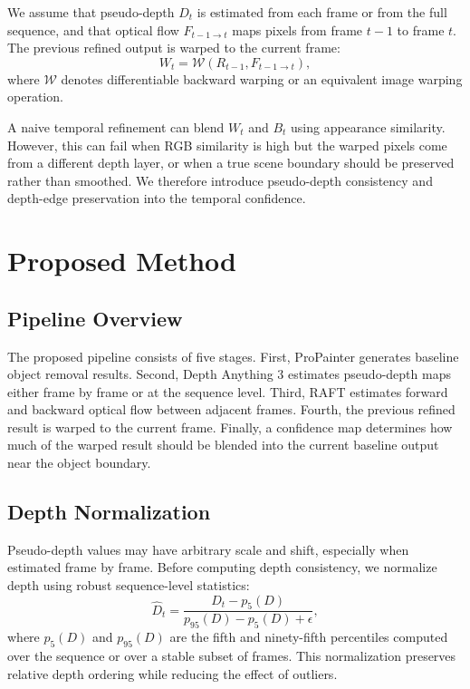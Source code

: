 \documentclass[nouppercase]{kaia}
\begin{document}
We assume that pseudo-depth $D_t$ is estimated from each frame or from the full sequence, and that optical flow $F_{t-1 \rightarrow t}$ maps pixels from frame $t-1$ to frame $t$. The previous refined output is warped to the current frame:
\begin{equation}
    W_t = \mathcal{W}(R_{t-1}, F_{t-1 \rightarrow t}),
\end{equation}
where $\mathcal{W}$ denotes differentiable backward warping or an equivalent image warping operation.

A naive temporal refinement can blend $W_t$ and $B_t$ using appearance similarity. However, this can fail when RGB similarity is high but the warped pixels come from a different depth layer, or when a true scene boundary should be preserved rather than smoothed. We therefore introduce pseudo-depth consistency and depth-edge preservation into the temporal confidence.

\section{Proposed Method}
\subsection{Pipeline Overview}
The proposed pipeline consists of five stages. First, ProPainter generates baseline object removal results. Second, Depth Anything 3 estimates pseudo-depth maps either frame by frame or at the sequence level. Third, RAFT estimates forward and backward optical flow between adjacent frames. Fourth, the previous refined result is warped to the current frame. Finally, a confidence map determines how much of the warped result should be blended into the current baseline output near the object boundary.

\subsection{Depth Normalization}
Pseudo-depth values may have arbitrary scale and shift, especially when estimated frame by frame. Before computing depth consistency, we normalize depth using robust sequence-level statistics:
\begin{equation}
    \hat{D}_t = \frac{D_t - p_5(D)}{p_{95}(D) - p_5(D) + \epsilon},
\end{equation}
where $p_5(D)$ and $p_{95}(D)$ are the fifth and ninety-fifth percentiles computed over the sequence or over a stable subset of frames. This normalization preserves relative depth ordering while reducing the effect of outliers.
\end{document}
